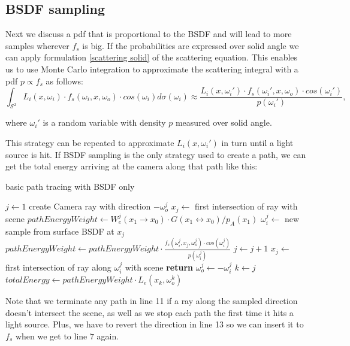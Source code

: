 \subsection{BSDF sampling}
Next we discuss a pdf that is proportional to the BSDF and will lead to more samples wherever $f_s$ is big. If the probabilities are expressed over solid angle we can apply formulation \ref{scattering solid} of the scattering equation. This enables us to use Monte Carlo integration to approximate the scattering integral with a pdf $p \propto f_s$ as follows:
\begin{equation}
\int_{\mathcal{S}^2} L_i(x,\omega_i) \cdot f_s(\omega_i,x,\omega_o) \cdot cos(\omega_i)d\sigma(\omega_i)\approx \frac{L_i(x,\omega_i') \cdot f_s(\omega_i',x,\omega_o) \cdot  cos(\omega_i')}{p(\omega_i')},
\end{equation}

where $\omega_i'$ is a random variable with density $p$ measured over solid angle.

This strategy can be repeated to approximate $L_i(x,\omega_i')$ in turn until a light source is hit. If BSDF sampling is the only strategy used to create a path, we can get the total energy arriving at the camera along that path like this:

\begin{algorithm}
\caption{basic path tracing with BSDF only}
\begin{algorithmic}[1]
\State $j \gets 1$
\State create Camera ray with direction $-\omega_o^j$
\State $x_j \gets$ first intersection of ray with scene
\State $pathEnergyWeight \gets W_e^j(x_1 \rightarrow x_0) \cdot G(x_1 \leftrightarrow x_0) / p_A(x_1)$
\State $\omega_i^j \gets $ new sample from surface BSDF at $x_j$
\State $pathEnergyWeight \gets pathEnergyWeight \cdot \frac{f_s(\omega_i^j,x_j,\omega_o^j) \cdot cos(\omega_i^j)}{p(\omega_i^j)}$
\State $j\gets j+1$
\State $x_j \gets $ first intersection of ray along $\omega_i^j $ with scene
\State \textbf{return} 
\EndIf
\State $\omega_o^j \gets -\omega_i^j $ 
\EndWhile
\State $k \gets j$
\State $totalEnergy \gets pathEnergyWeight \cdot L_e(x_k,\omega_o^k)$
\end{algorithmic}

\label{weightPath_BSDF}\end{algorithm}

\pagebreak
Note that we terminate any path in line 11 if a ray along the sampled direction doesn't intersect the scene, as well as we stop each path the first time it hits a light source. Plus, we have to revert the direction in line 13 so we can insert it to $f_s$ when we get to line $7$ again.

